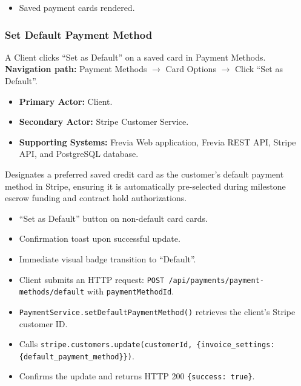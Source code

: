 \begin{itemize}[leftmargin=1.6em,topsep=3pt,itemsep=2pt,parsep=0pt,label=$\bullet$]
      \item Saved payment cards rendered.
\end{itemize}

\subsubsection{ Set Default Payment Method}

A Client clicks ``Set as Default'' on a saved card in Payment Methods.\newline
\textbf{Navigation path:} Payment Methods $\rightarrow$ Card Options $\rightarrow$ Click ``Set as Default''.


\begin{itemize}[leftmargin=1.6em,topsep=3pt,itemsep=2pt,parsep=0pt,label=$\bullet$]
      \item \textbf{Primary Actor:} Client.
      \item \textbf{Secondary Actor:} Stripe Customer Service.
      \item \textbf{Supporting Systems:} Frevia Web application, Frevia REST API, Stripe API, and PostgreSQL database.
\end{itemize}

\noindent Designates a preferred saved credit card as the customer's default payment method in Stripe, ensuring it is automatically pre-selected during milestone escrow funding and contract hold authorizations.

\begin{itemize}[leftmargin=1.6em,topsep=3pt,itemsep=2pt,parsep=0pt,label=$\bullet$]
      \item ``Set as Default'' button on non-default card cards.
      \item Confirmation toast upon successful update.
      \item Immediate visual badge transition to ``Default''.
\end{itemize}

\begin{itemize}[leftmargin=1.6em,topsep=3pt,itemsep=2pt,parsep=0pt,label=$\bullet$]
      \item Client submits an HTTP request: \texttt{POST /api/payments/payment-methods/default} with \texttt{paymentMethodId}.
      \item \texttt{PaymentService.setDefaultPaymentMethod()} retrieves the client's Stripe customer ID.
      \item Calls \texttt{stripe.customers.update(customerId, \{invoice\_settings: \{default\_payment\_method\}\})}.
      \item Confirms the update and returns HTTP 200 \texttt{\{success: true\}}.
\end{itemize}

